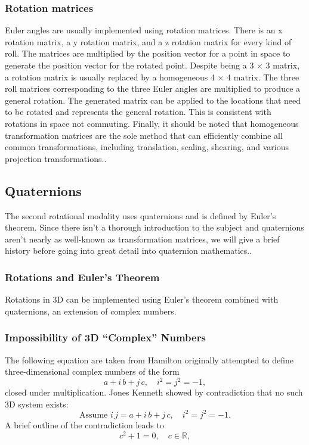 \documentclass[12pt]{article}
\begin{document}
\subsubsection{Rotation matrices}
Euler angles are usually implemented using rotation matrices. There is an x rotation matrix, a y rotation matrix, and a z rotation matrix for every kind of roll. The matrices are multiplied by the position vector for a point in space to generate the position vector for the rotated point.  Despite being a 3 × 3 matrix, a rotation matrix is usually replaced by a homogeneous 4 × 4 matrix. The three roll matrices corresponding to the three Euler angles are multiplied to produce a general rotation. The generated matrix can be applied to the locations that need to be rotated and represents the general rotation. This is consistent with rotations in space not commuting.
Finally, it should be noted that homogeneous transformation matrices are the sole method that can efficiently combine all common transformations, including translation, scaling, shearing, and various projection transformations.\cite{ref20}.

\subsection{Quaternions}
The second rotational modality uses quaternions and is defined by Euler's theorem. Since there isn't a thorough introduction to the subject and quaternions aren't nearly as well-known as transformation matrices, we will give a brief history before going into great detail into quaternion mathematics.\cite{ref20}.\\

\subsubsection{Rotations and Euler’s Theorem}
Rotations in 3D can be implemented using Euler’s theorem combined with quaternions, an extension of complex numbers\cite{ref20}.

\subsubsection{Impossibility of 3D ``Complex'' Numbers}
The following equation are taken from \cite{ref20}
Hamilton originally attempted to define three-dimensional complex numbers of the form\\
\[
  a + i\,b + j\,c,\quad i^2 = j^2 = -1,
\]
closed under multiplication. Jones Kenneth\cite{jones1984kenneth} showed by contradiction that no such 3D system exists:
\[
  \text{Assume }i\,j = a + i\,b + j\,c,\quad
  i^2 = j^2 = -1.
\]
A brief outline of the contradiction leads to
\[
  c^2 + 1 = 0,\quad c\in\mathbb{R},
\]
\end{document}
